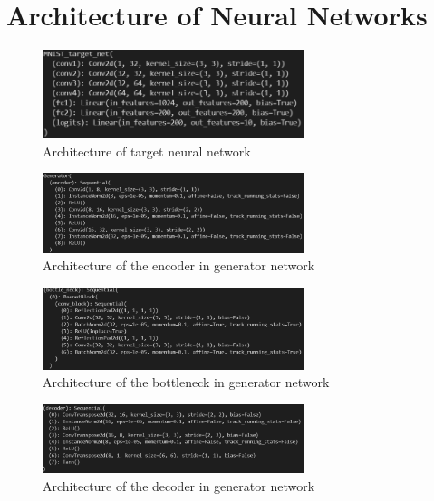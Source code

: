 \documentclass[lettersize,journal]{IEEEtran}
\begin{document}
{\appendix[]
    \section*{Architecture of Neural Networks}
    
    \begin{figure}[!h]
    \centering
    \includegraphics[width=3in]{target_model_arch.PNG}
    \caption{Architecture of target neural network}
    \label{target_model_arch}
    \end{figure}
    
    \begin{figure}[!h]
    \centering
    \includegraphics[width=3in]{gen_arch_enc.PNG}
    \caption{Architecture of the encoder in generator network}
    \label{gen_arch_enc}
    \end{figure}
    
    \begin{figure}[!h]
    \centering
    \includegraphics[width=3in]{gen_arch_bottleneck.PNG}
    \caption{Architecture of the bottleneck in generator network}
    \label{gen_arch_bottleneck}
    \end{figure}
    
    \begin{figure}[!h]
    \centering
    \includegraphics[width=3in]{gen_arch_dec.PNG}
    \caption{Architecture of the decoder in generator network}
    \label{gen_arch_dec}
    \end{figure}
    
}
\end{document}
